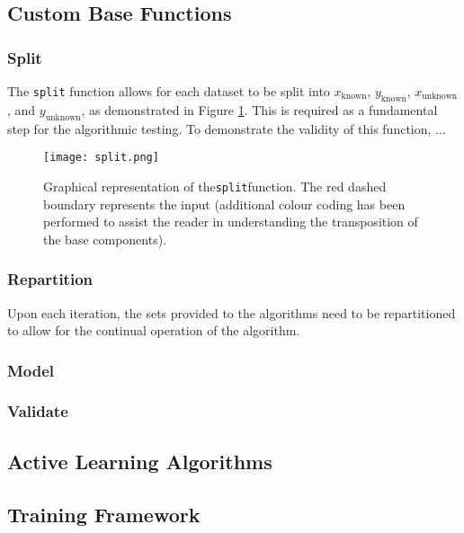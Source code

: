 \subsection{Custom Base Functions}
\subsubsection{Split}
The \lstinline{split} function allows for each dataset to be split into $x_\mathrm{known}$, $y_\mathrm{known}$, $x_\mathrm{unknown}$, and $y_\mathrm{unknown}$, as demonstrated in Figure \ref{fig:Split}. This is required as a fundamental step for the algorithmic testing. To demonstrate the validity of this function, ...

\begin{figure}
    \begin{center}
        \texttt{[image: split.png]}
    \end{center}
    \caption{Graphical representation of the\lstinline{split}function. The red dashed boundary represents the input (additional colour coding has been performed to assist the reader in understanding the transposition of the base components).}
    \label{fig:Split}
\end{figure}


\subsubsection{Repartition}
Upon each iteration, the sets provided to the algorithms need to be repartitioned to allow for the continual operation of the algorithm.
\\
\subsubsection{Model}
\blindtext[1]
\subsubsection{Validate}
\blindtext[1]
\subsection{Active Learning Algorithms}
\blindtext[1]
\subsection{Training Framework}
\blindtext[1]

